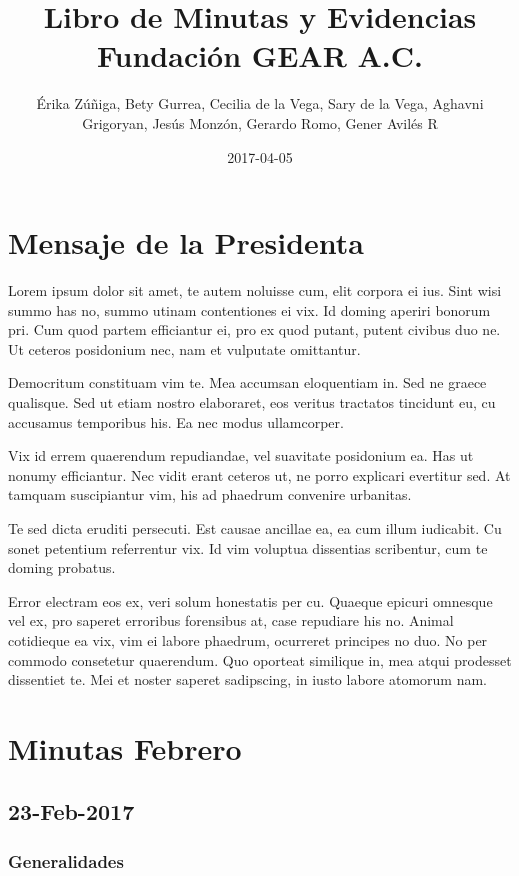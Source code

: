 \documentclass[]{book}
\title{Libro de Minutas y Evidencias Fundación GEAR A.C.}
\author{Érika Zúñiga, Bety Gurrea, Cecilia de la Vega, Sary de la Vega, Aghavni
Grigoryan, Jesús Monzón, Gerardo Romo, Gener Avilés R}
\date{2017-04-05}
\begin{document}
\maketitle

{
\setcounter{tocdepth}{1}
\tableofcontents
}
\chapter{Mensaje de la Presidenta}\label{mensaje-de-la-presidenta}

Lorem ipsum dolor sit amet, te autem noluisse cum, elit corpora ei ius.
Sint wisi summo has no, summo utinam contentiones ei vix. Id doming
aperiri bonorum pri. Cum quod partem efficiantur ei, pro ex quod putant,
putent civibus duo ne. Ut ceteros posidonium nec, nam et vulputate
omittantur.

Democritum constituam vim te. Mea accumsan eloquentiam in. Sed ne graece
qualisque. Sed ut etiam nostro elaboraret, eos veritus tractatos
tincidunt eu, cu accusamus temporibus his. Ea nec modus ullamcorper.

Vix id errem quaerendum repudiandae, vel suavitate posidonium ea. Has ut
nonumy efficiantur. Nec vidit erant ceteros ut, ne porro explicari
evertitur sed. At tamquam suscipiantur vim, his ad phaedrum convenire
urbanitas.

Te sed dicta eruditi persecuti. Est causae ancillae ea, ea cum illum
iudicabit. Cu sonet petentium referrentur vix. Id vim voluptua
dissentias scribentur, cum te doming probatus.

Error electram eos ex, veri solum honestatis per cu. Quaeque epicuri
omnesque vel ex, pro saperet erroribus forensibus at, case repudiare his
no. Animal cotidieque ea vix, vim ei labore phaedrum, ocurreret
principes no duo. No per commodo consetetur quaerendum. Quo oporteat
similique in, mea atqui prodesset dissentiet te. Mei et noster saperet
sadipscing, in iusto labore atomorum nam.

\chapter{Minutas Febrero}\label{intro}

\section{23-Feb-2017}\label{feb-2017}

\subsection{Generalidades}\label{generalidades}
\end{document}
